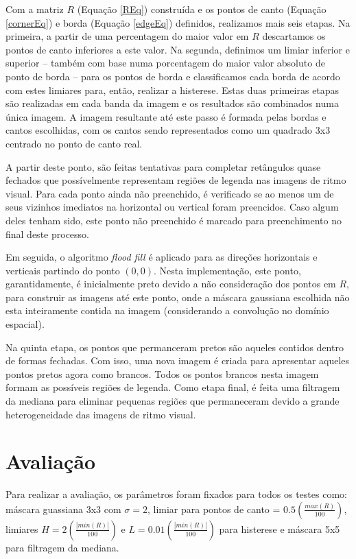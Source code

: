 \documentclass[12pt]{article}
\begin{document}
Com a matriz $R$ (Equação \ref{REq}) construída e os pontos de canto
(Equação \ref{cornerEq}) e borda (Equação \ref{edgeEq}) definidos,
realizamos mais seis etapas. Na primeira, a partir de uma percentagem
do maior valor em $R$ descartamos os pontos de canto inferiores a este
valor. Na segunda, definimos um limiar inferior e superior -- também
com base numa porcentagem do maior valor absoluto de ponto de borda --
para os pontos de borda e classificamos cada borda de acordo com estes
limiares para, então, realizar a histerese. Estas duas primeiras
etapas são realizadas em cada banda da imagem e os resultados são
combinados numa única imagem. A imagem resultante até este passo é
formada pelas bordas e cantos escolhidas, com os cantos sendo
representados como um quadrado 3x3 centrado no ponto de canto real.

A partir deste ponto, são feitas tentativas para completar retângulos
quase fechados que possívelmente representam regiões de legenda nas
imagens de ritmo visual. Para cada ponto ainda não preenchido, é
verificado se ao menos um de seus vizinhos imediatos na horizontal
ou vertical foram preencidos. Caso algum deles tenham sido, este ponto
não preenchido é marcado para preenchimento no final deste processo.

Em seguida, o algoritmo \textit{flood fill} é aplicado para as
direções horizontais e verticais partindo do ponto $(0, 0)$. Nesta
implementação, este ponto, garantidamente, é inicialmente preto devido
a não consideração dos pontos em $R$, para construir as imagens até
este ponto, onde a máscara gaussiana escolhida não esta
inteiramente contida na imagem (considerando a convolução no domínio
espacial).

Na quinta etapa, os pontos que permanceram pretos são aqueles contidos
dentro de formas fechadas. Com isso, uma nova imagem é
criada para apresentar aqueles pontos pretos agora como brancos. Todos
os pontos brancos nesta imagem formam as possíveis regiões de
legenda. Como etapa final, é feita uma filtragem da mediana para
eliminar pequenas regiões que permaneceram devido a grande
heterogeneidade das imagens de ritmo visual.

\section{Avaliação}

Para realizar a avaliação, os parâmetros foram fixados para
todos os testes como: máscara guassiana 3x3 com $\sigma = 2$, limiar para
pontos de canto = $0.5 (\frac{max(R)}{100})$, limiares
$H = 2 (\frac{|min(R)|}{100})$ e $L = 0.01 (\frac{|min(R)|}{100})$ para
histerese e máscara 5x5 para filtragem da mediana.
\end{document}
